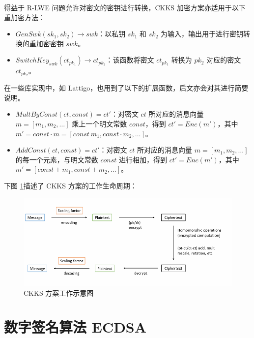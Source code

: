 得益于 R-LWE 问题允许对密文的密钥进行转换\cite{brakerski2014leveled}，CKKS 加密方案亦适用于以下重加密方法：

\begin{itemize}
    \item $GenSwk(sk_1, sk_2) \rightarrow swk$：以私钥 $sk_1$ 和 $sk_2$ 为输入，输出用于进行密钥转换的重加密密钥 $swk$。
    \item $SwitchKey_{swk}(ct_{pk_1}) \rightarrow ct_{pk_2}$：该函数将密文 $ct_{pk_1}$ 转换为 $pk_2$ 对应的密文 $ct_{pk_2}$。
\end{itemize}

在一些库实现中，如 Lattigo，也用到了以下的扩展函数，后文亦会对其进行简要说明。


\begin{itemize}
    \item $MultByConst(ct, const) = ct'$：对密文 $ct$ 所对应的消息向量 $m = [m_1, m_2, \dots]$ 乘上一个明文常数 $const$，得到 $ct' = Enc(m')$，其中 $m' = const \cdot m  = [const \ m_1, const \cdot m_2, \dots]$。
    \item $AddConst(ct, const) = ct'$：对密文 $ct$ 所对应的消息向量 $m = [m_1, m_2, \dots]$ 的每一个元素，与明文常数 $const$ 进行相加，得到 $ct' = Enc(m')$，其中 $m' = [const + m_1, const + m_2, \dots]$。
\end{itemize}

下图\cite{ckksIntroduct} \ref*{Fig:CKKS}描述了 CKKS 方案的工作生命周期：

\begin{figure}[ht]
    \centering
    \includegraphics[width=\linewidth]{./Figures/CKKS_Diagram.png}
    \caption{CKKS 方案工作示意图}\label{Fig:CKKS}
\end{figure}

\section{数字签名算法 ECDSA} \label{sec:ecdsa}

